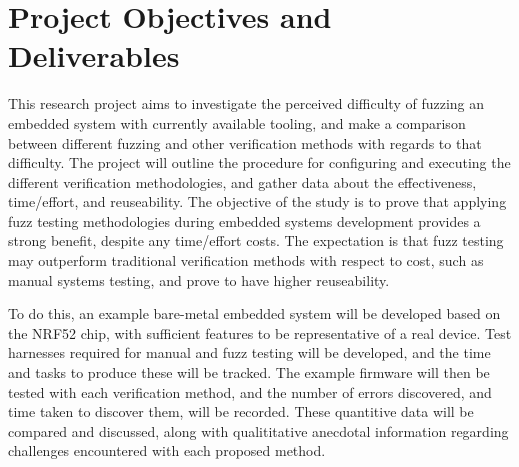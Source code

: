 \documentclass[11pt]{article}
\begin{document}

\section{Project Objectives and Deliverables} \label{sec:2}
This research project aims to investigate the perceived difficulty of fuzzing
an embedded system with currently available tooling, and make a comparison
between different fuzzing and other verification methods with regards to that
difficulty. The project will outline the procedure for configuring and
executing the different verification methodologies, and gather data about the
effectiveness, time/effort, and reuseability. The objective of the study is to
prove that applying fuzz testing methodologies during embedded systems
development provides a strong benefit, despite any time/effort costs. The
expectation is that fuzz testing may outperform traditional verification
methods with respect to cost, such as manual systems testing, and prove to have
higher reuseability.

To do this, an example bare-metal embedded system will be developed based on
the NRF52 chip, with sufficient features to be representative of a real device.
Test harnesses required for manual and fuzz testing will be developed, and the
time and tasks to produce these will be tracked. The example firmware will then
be tested with each verification method, and the number of errors discovered,
and time taken to discover them, will be recorded. These quantitive data will
be compared and discussed, along with qualititative anecdotal information
regarding challenges encountered with each proposed method.

\end{document}
